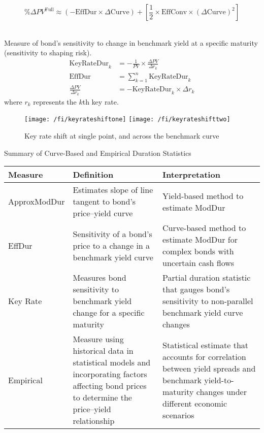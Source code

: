 \begin{remark} 
\begin{equation}
\% \Delta PV^{\text{Full}} \approx (-\text{EffDur} \times \Delta \text{Curve}) + \left[ \frac{1}{2} \times \text{EffConv} \times (\Delta \text{Curve})^2 \right] \nonumber
\end{equation}
\end{remark}

\begin{definition} \\
Measure of bond’s sensitivity to change in benchmark yield at a specific maturity (sensitivity to shaping risk).
\begin{align}
\text{KeyRateDur}_k &= - \frac{1}{PV} \times \frac{\Delta PV}{\Delta r_k} \nonumber \\
\text{EffDur} &= \sum\limits_{k=1}^n \text{KeyRateDur}_k \nonumber \\
\frac{\Delta PV}{\Delta r_k} &= -\text{KeyRateDur}_k \times \Delta r_k \nonumber
\end{align}
where $r_k$ represents the $k$th key rate.
\end{definition}

\begin{figure}[H]
\centering
\texttt{[image: /fi/keyrateshiftone]}
\texttt{[image: /fi/keyrateshifttwo]}
\caption{Key rate shift at single point, and across the benchmark curve}
\end{figure}

\begin{flushleft}
Summary of Curve-Based and Empirical Duration Statistics
\begin{tabularx}{\textwidth}{p{7em}|X|X}
\hline
\rowcolor{gray!30}
Measure & Definition & Interpretation \\
\hline
ApproxModDur & Estimates slope of line tangent to bond’s price–yield curve & Yield-based method to estimate ModDur \\
\hline
EffDur & Sensitivity of a bond’s price to a change in a benchmark yield curve & Curve-based method to estimate ModDur for complex bonds with uncertain cash flows \\
\hline
Key Rate & Measures bond sensitivity to benchmark yield change for a specific maturity & Partial duration statistic that gauges bond’s sensitivity to non-parallel benchmark yield curve changes \\
\hline
Empirical & Measure using historical data in statistical models and incorporating factors affecting bond prices to determine the price–yield relationship & Statistical estimate that accounts for correlation between yield spreads and benchmark yield-to-maturity changes under different economic scenarios \\
\hline
\end{tabularx}
\end{flushleft}